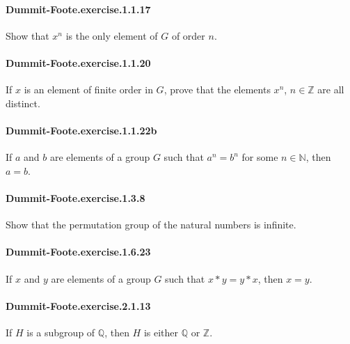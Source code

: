 \documentclass{article}
\begin{document}
\paragraph{Dummit-Foote.exercise.1.1.17} Show that $x^n$ is the only element of $G$ of order $n$.

\paragraph{Dummit-Foote.exercise.1.1.20} If $x$ is an element of finite order in $G$, prove that the elements $x^n$, $n\in\mathbb{Z}$ are all distinct.

\paragraph{Dummit-Foote.exercise.1.1.22b} If $a$ and $b$ are elements of a group $G$ such that $a^n = b^n$ for some $n \in \mathbb{N}$, then $a = b$.


\paragraph{Dummit-Foote.exercise.1.3.8} Show that the permutation group of the natural numbers is infinite.


\paragraph{Dummit-Foote.exercise.1.6.23} If $x$ and $y$ are elements of a group $G$ such that $x*y=y*x$, then $x=y$.

\paragraph{Dummit-Foote.exercise.2.1.13} If $H$ is a subgroup of $\mathbb{Q}$, then $H$ is either $\mathbb{Q}$ or $\mathbb{Z}$.
\end{document}
